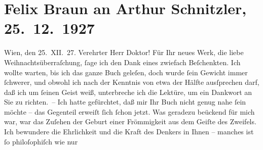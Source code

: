 

               \section[Felix Braun an Arthur Schnitzler, 25. 12. 1927]{ Felix Braun an Arthur Schnitzler, 25. 12. 1927}\nopagebreak{}\rehead{ }\begin{ledgroupsized}[t]{13cm}\normalsize\beginnumbering{} \toendnotes[C]{\smallbreak\pagebreak[2]} 
\toendnotes[C]{\smallbreak}\pstart
           \centering{}{\pb}Wien, den 25. XII. 27.\pend
           \pstart{}Verehrter Herr Doktor!\pend\pstart
           Für Ihr neues Werk, die liebe
               Weihnachtsüberraſchung, ſage ich den Dank eines zwiefach Beſchenkten. Ich wollte
               warten, bis ich das ganze Buch geleſen, doch wurde ſein Gewicht immer ſchwerer, und
               obwohl ich nach der Kenntnis von etwa der Hälfte ausſprechen darf, daß ich um ſeinen
               Geist weiß, unterbreche ich die Lektüre, um ein Dankwort an Sie zu richten. – \pend
           \pstart
           Ich hatte gefürchtet, daß mir Ihr Buch nicht genug \introOben{}nahe\introOben{} ſein
               möchte – das Gegenteil erweiſt ſich ſchon jetzt. Was geradezu beückend für {\pb}mich war, war das
               Zuſehen der Geburt einer Frömmigkeit aus dem Geiſte des Zweifels. Ich bewundere die
               Ehrlichkeit und die Kraft des Denkers in Ihnen – manches ist ſo philoſophiſch wie nur

\end{ledgroupsized}
